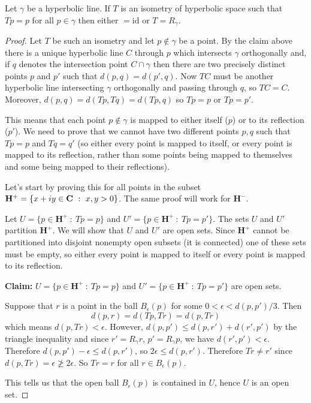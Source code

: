\documentclass[12pt]{article}
\begin{document}
\begin{lma}
  Let $\gamma$ be a hyperbolic line. If $T$ is an isometry of hyperbolic space such that $Tp=p$ for all $p\in\gamma$ then either $=\mathrm{id}$ or $T=R_{\gamma}$.
\end{lma}
\begin{proof}
  Let $T$ be such an isometry and let $p\not\in\gamma$ be a point. By the claim above there is a unique hyperbolic line $C$ through $p$ which intersects $\gamma$ orthogonally and, if $q$ denotes the intersection point $C\cap\gamma$ then there are two precisely distinct points $p$ and $p'$ such that $d(p,q)=d(p',q)$. Now $TC$ must be another hyperbolic line intersecting $\gamma$ orthogonally and passing through $q$, so $TC=C$. Moreover, $d(p,q)=d(Tp,Tq)=d(Tp,q)$ so $Tp=p$ or $Tp=p'$.

This means that each point $p\not\in\gamma$ is mapped to either itself ($p$) or to its reflection ($p'$). We need to prove that we cannot have two different points $p,q$ such that $Tp=p$ and $Tq=q'$ (so either every point is mapped to itself, or every point is mapped to its reflection, rather than some points being mapped to themselves and some being mapped to their reflections).

Let's start by proving this for all points in the subset $\mathbf{H}^+=\{x+iy\in\mathbf{C}\ :\ x,y>0\}$. The same proof will work for $\mathbf{H}^-$.

Let $U=\{p\in\mathbf{H}^+\ :\ Tp=p\}$ and $U'=\{p\in\mathbf{H}^+\ :\ Tp=p'\}$. The sets $U$ and $U'$ partition $\mathbf{H}^+$. We will show that $U$ and $U'$ are open sets. Since $\mathbf{H}^+$ cannot be partitioned into disjoint nonempty open subsets (it is connected) one of these sets must be empty, so either every point is mapped to itself or every point is mapped to its reflection.

  {\bf Claim:} $U=\{p\in\mathbf{H}^+\ :\ Tp=p\}$ and $U'=\{p\in\mathbf{H}^+\ :\ Tp=p'\}$ are open sets.

  Suppose that $r$ is a point in the ball $B_\epsilon(p)$ for some $0<\epsilon<d(p,p')/3$. Then
  \[d(p,r)=d(Tp,Tr)=d(p,Tr)\]
  which means $d(p,Tr)<\epsilon$. However, $d(p,p')\leq d(p,r')+d(r',p')$ by the triangle inequality and since $r'=R_{\gamma}r$, $p'=R_{\gamma}p$, we have $d(r',p')<\epsilon$. Therefore $d(p,p')-\epsilon\leq d(p,r')$, so $2\epsilon\leq d(p,r')$. Therefore $Tr\neq r'$ since $d(p,Tr)=\epsilon\not\geq 2\epsilon$. So $Tr=r$ for all $r\in B_{\epsilon}(p)$.

  This tells us that the open ball $B_\epsilon(p)$ is contained in $U$, hence $U$ is an open set.


\end{proof}
\end{document}
